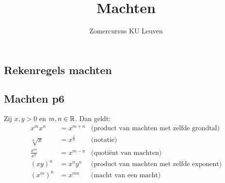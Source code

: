 \documentclass{ximera}
\author{Zomercursus KU Leuven}
\title[Rekenvaardigheden:]{Machten}
\begin{document}
\begin{abstract}
	
\end{abstract}
\maketitle

\subsection{Rekenregels machten}\label{machtenrekenregels}

\begin{proposition}
	
\subsection{Machten p6}
Zij $x,y>0$ en $m,n\in\mathbb R$. Dan geldt:
\begin{align*}
	x^{m}x^{n}          &= x^{m+n}     & \text{(product van machten met zelfde grondtal)}\\
	\sqrt[n] x          &= x^{\frac1n}  & \text{(notatie)}\\
	\frac{x^{m}}{x^{n}} &= x^{m-n}      & \text{(quotiënt van machten)} \\
	(xy)^n              &= x^ny^n      & \text{(product van machten met zelfde exponent)}\\
	\left(x^{m}\right)^{n}&= x^{mn}    & \text{(macht van een macht)}\\	
\end{align*}
\end{proposition}
\end{document}
